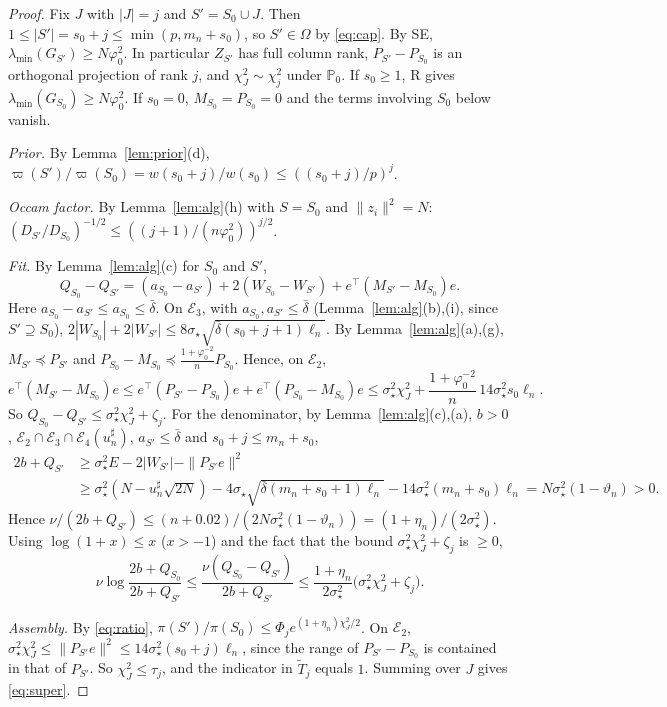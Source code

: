 \documentclass[11pt]{article}
\theoremstyle{remark}
\renewcommand{\P}{\mathbb P}
\newcommand{\vp}{\varpi}
\newcommand{\sst}{\sigma_\star}
\begin{document}
\begin{proof}
Fix $J$ with $|J|=j$ and $S'=S_0\cup J$. Then $1\le|S'|=s_0+j\le\min(p,m_n+s_0)$, so $S'\in\Omega$ by \eqref{eq:cap}. By SE, $\lambda_{\min}(G_{S'})\ge N\varphi_0^2$. In particular $Z_{S'}$ has full column rank, $P_{S'}-P_{S_0}$ is an orthogonal projection of rank $j$, and $\chi^2_J\sim\chi^2_j$ under $\P_0$. If $s_0\ge1$, R gives $\lambda_{\min}(G_{S_0})\ge N\varphi_0^2$. If $s_0=0$, $M_{S_0}=P_{S_0}=0$ and the terms involving $S_0$ below vanish.

\emph{Prior.} By Lemma~\ref{lem:prior}(d), $\vp(S')/\vp(S_0)=w(s_0+j)/w(s_0)\le((s_0+j)/p)^j$.

\emph{Occam factor.} By Lemma~\ref{lem:alg}(h) with $S=S_0$ and $\|z_i\|^2=N$: $(D_{S'}/D_{S_0})^{-1/2}\le((j+1)/(n\varphi_0^2))^{j/2}$.

\emph{Fit.} By Lemma~\ref{lem:alg}(c) for $S_0$ and $S'$,
\[
Q_{S_0}-Q_{S'}=(a_{S_0}-a_{S'})+2(W_{S_0}-W_{S'})+e^\top(M_{S'}-M_{S_0})e .
\]
Here $a_{S_0}-a_{S'}\le a_{S_0}\le\bar\delta$. On $\mathcal E_3$, with $a_{S_0},a_{S'}\le\bar\delta$ (Lemma~\ref{lem:alg}(b),(i), since $S'\supseteq S_0$), $2|W_{S_0}|+2|W_{S'}|\le8\sst\sqrt{\bar\delta(s_0+j+1)\ell_n}$. By Lemma~\ref{lem:alg}(a),(g), $M_{S'}\preceq P_{S'}$ and $P_{S_0}-M_{S_0}\preceq\frac{1+\varphi_0^{-2}}nP_{S_0}$. Hence, on $\mathcal E_2$,
\[
e^\top(M_{S'}-M_{S_0})e\le e^\top(P_{S'}-P_{S_0})e+e^\top(P_{S_0}-M_{S_0})e\le\sst^2\chi^2_J+\frac{1+\varphi_0^{-2}}n\,14\sst^2s_0\ell_n .
\]
So $Q_{S_0}-Q_{S'}\le\sst^2\chi^2_J+\zeta_j$. For the denominator, by Lemma~\ref{lem:alg}(c),(a), $b>0$, $\mathcal E_2\cap\mathcal E_3\cap\mathcal E_4(u^\sharp_n)$, $a_{S'}\le\bar\delta$ and $s_0+j\le m_n+s_0$,
\[
\begin{aligned}
2b+Q_{S'}&\ge\sst^2E-2|W_{S'}|-\|P_{S'}e\|^2\\
&\ge\sst^2(N-u^\sharp_n\sqrt{2N})-4\sst\sqrt{\bar\delta(m_n+s_0+1)\ell_n}-14\sst^2(m_n+s_0)\ell_n=N\sst^2(1-\vartheta_n)>0 .
\end{aligned}
\]
Hence $\nu/(2b+Q_{S'})\le(n+0.02)/(2N\sst^2(1-\vartheta_n))=(1+\eta_n)/(2\sst^2)$. Using $\log(1+x)\le x$ ($x>-1$) and the fact that the bound $\sst^2\chi^2_J+\zeta_j$ is $\ge0$,
\[
\nu\log\frac{2b+Q_{S_0}}{2b+Q_{S'}}\le\frac{\nu(Q_{S_0}-Q_{S'})}{2b+Q_{S'}}\le\frac{1+\eta_n}{2\sst^2}\big(\sst^2\chi^2_J+\zeta_j\big).
\]

\emph{Assembly.} By \eqref{eq:ratio}, $\pi(S')/\pi(S_0)\le\Phi_je^{(1+\eta_n)\chi^2_J/2}$. On $\mathcal E_2$, $\sst^2\chi^2_J\le\|P_{S'}e\|^2\le14\sst^2(s_0+j)\ell_n$, since the range of $P_{S'}-P_{S_0}$ is contained in that of $P_{S'}$. So $\chi^2_J\le\tau_j$, and the indicator in $\tilde T_j$ equals $1$. Summing over $J$ gives \eqref{eq:super}.


\end{proof}
\end{document}
